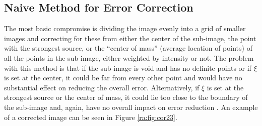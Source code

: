 \subsection{Naive Method for Error Correction}
The most basic compromise is dividing the image evenly into a grid of smaller images and correcting for these from either the center of the sub-image, the point with the strongest source, or the ``center of mass'' (average location of points) of all the points in the sub-image, either weighted by intensity or not. The problem with this method is that if the sub-image is void and has no definite points or if $\xi$ is set at the center, it could be far from every other point and would have no substantial effect on reducing the overall error. Alternatively, if $\xi$ is set at the strongest source or the center of mass, it could lie too close to the boundary of the sub-image and, again, have no overall impact on error reduction \citep{tasse2016tessellation}. An example of a corrected image can be seen in Figure \ref{ra:fig:cor23}.



